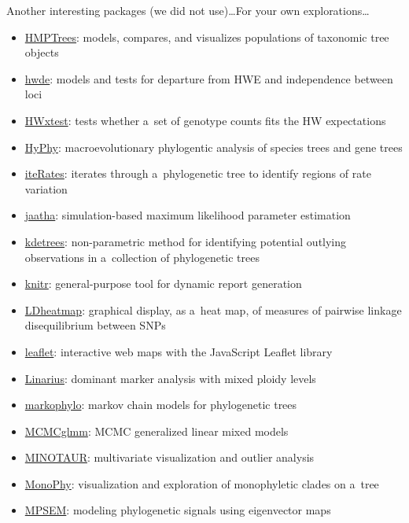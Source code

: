 \documentclass[compress, ucs, xelatex, 11pt, xcolor=svgnames,
  hyperref={
    bookmarks=true,
    unicode=true,
    colorlinks=true,
    pdftitle={Molecular data in R},
    plainpages=false,
    pdfauthor={Vojtech Zeisek},
    pdfsubject={Course about phylogeny and evolution in R},
    pdfcreator={XeLaTeX},
    pdfkeywords={R, evolution, phylogeny, molecular data},
    linkcolor=Tomato,
    anchorcolor=SaddleBrown,
    citecolor=Goldenrod,
    filecolor=DarkMagenta,
    menucolor=Sienna,
    urlcolor=DarkTurquoise,
    pdftex},
  url={hyphens, lowtilde} %
  ]{beamer}
\begin{document}
\begin{frame}[allowframebreaks]{Another interesting packages (we did not use)\ldots}{For your own explorations\ldots}
\begin{itemize}
    \item \href{https://CRAN.R-project.org/package=HMPTrees}{HMPTrees}: models, compares, and visualizes populations of taxonomic tree objects
    \item \href{https://CRAN.R-project.org/package=hwde}{hwde}: models and tests for departure from HWE and independence between loci
    \item \href{https://CRAN.R-project.org/package=HWxtest}{HWxtest}: tests whether a~set of genotype counts fits the HW expectations
    \item \href{https://CRAN.R-project.org/package=HyPhy}{HyPhy}: macroevolutionary phylogentic analysis of species trees and gene trees
    \item \href{https://CRAN.R-project.org/package=iteRates}{iteRates}: iterates through a~phylogenetic tree to identify regions of rate variation
    \item \href{https://CRAN.R-project.org/package=jaatha}{jaatha}: simulation-based maximum likelihood parameter estimation
    \item \href{https://CRAN.R-project.org/package=kdetrees}{kdetrees}: non-parametric method for identifying potential outlying observations in a~collection of phylogenetic trees
    \item \href{https://CRAN.R-project.org/package=knitr}{knitr}: general-purpose tool for dynamic report generation
    \item \href{https://CRAN.R-project.org/package=LDheatmap}{LDheatmap}: graphical display, as a~heat map, of measures of pairwise linkage disequilibrium between SNPs
    \item \href{https://CRAN.R-project.org/package=leaflet}{leaflet}: interactive web maps with the JavaScript Leaflet library
    \item \href{https://github.com/giby/Linarius}{Linarius}: dominant marker analysis with mixed ploidy levels
    \item \href{https://CRAN.R-project.org/package=markophylo}{markophylo}: markov chain models for phylogenetic trees
    \item \href{https://CRAN.R-project.org/package=MCMCglmm}{MCMCglmm}: MCMC generalized linear mixed models
    \item \href{https://github.com/NESCent/MINOTAUR}{MINOTAUR}: multivariate visualization and outlier analysis
    \item \href{https://cran.r-project.org/package=MonoPhy}{MonoPhy}: visualization and exploration of monophyletic clades on a~tree
    \item \href{https://CRAN.R-project.org/package=MPSEM}{MPSEM}: modeling phylogenetic signals using eigenvector maps

\end{itemize}
\end{frame}
\end{document}
